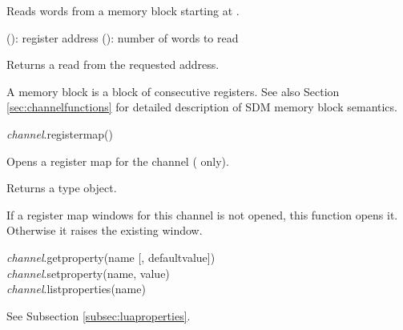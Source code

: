 \documentclass[a4paper,12pt,twoside,extrafontsizes]{memoir}
\begin{document}
\begin{funcdescr}
	Reads  words from a memory block starting at .
\end{funcdescr}

\begin{funcparams}
	 (): register address
	 (): number of words to read
\end{funcparams}

\begin{funcret}
	Returns a  read from the requested address.
\end{funcret}

\begin{funcremarks}
	A memory block is a block of consecutive registers. See also Section \ref{sec:channelfunctions} for detailed description of SDM memory block semantics.
\end{funcremarks}


\begin{luafuncprototype}
\emph{channel}.registermap()
\end{luafuncprototype}

\begin{funcdescr}
	Opens a register map for the channel ( only).
\end{funcdescr}

\begin{funcret}
	Returns a  type object.
\end{funcret}

\begin{funcremarks}
	If a register map windows for this channel is not opened, this function opens it. Otherwise it raises the existing window.
\end{funcremarks}


\begin{luafuncprototype}
\emph{channel}.getproperty(name [, defaultvalue])\\
\emph{channel}.setproperty(name, value)\\
\emph{channel}.listproperties(name)
\end{luafuncprototype}

\begin{funcdescr}
	See Subsection \ref{subsec:luaproperties}.
\end{funcdescr}
\end{document}
